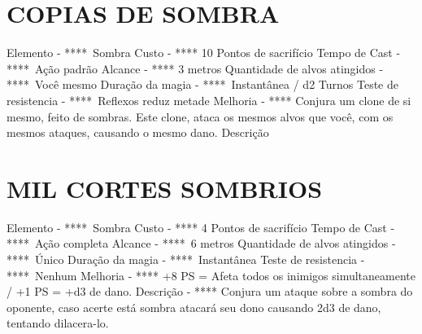 \documentclass{article}%
\begin{document}
\section{COPIAS DE SOMBRA}%
\label{sec:COPIASDESOMBRA}%
Elemento {-} ****~Sombra\newline%
Custo {-} **** 10 Pontos de sacrifício\newline%
Tempo de Cast {-} ****~Ação padrão\newline%
Alcance {-} **** 3 metros\newline%
Quantidade de alvos atingidos {-} ****~Você mesmo\newline%
Duração da magia {-} ****~Instantânea / d2 Turnos\newline%
Teste de resistencia {-} ****~Reflexos reduz metade\newline%
Melhoria {-} **** Conjura um clone de si mesmo, feito de sombras. Este clone, ataca os mesmos alvos que você, com os mesmos ataques, causando o mesmo dano.\newline%
Descrição \newline%

%
\section{MIL CORTES SOMBRIOS}%
\label{sec:MILCORTESSOMBRIOS}%
Elemento {-} ****~Sombra\newline%
Custo {-} **** 4 Pontos de sacrifício\newline%
Tempo de Cast {-} ****~Ação completa\newline%
Alcance {-} ****~6 metros\newline%
Quantidade de alvos atingidos {-} ****~Único\newline%
Duração da magia {-} ****~Instantânea\newline%
Teste de resistencia {-} ****~Nenhum\newline%
Melhoria {-} **** +8 PS = Afeta todos os inimigos simultaneamente / +1 PS = +d3 de dano.\newline%
Descrição {-} **** Conjura um ataque sobre a sombra do oponente, caso acerte está sombra atacará seu dono causando 2d3 de dano, tentando dilacera{-}lo.\newline%

%
\end{document}
